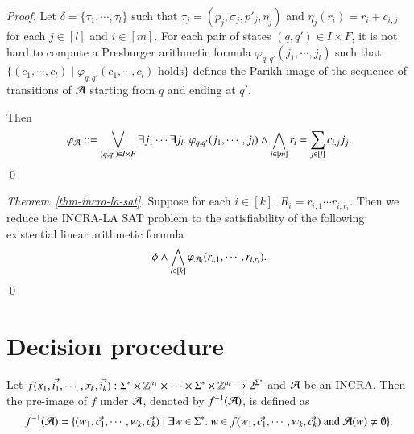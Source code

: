 \documentclass[sigplan,review,anonymous]{acmart}\settopmatter{printfolios=true,printccs=false,printacmref=false}
\begin{document}
\begin{proof}
	Let $\delta = \{\tau_1, \cdots, \tau_l\}$ such that $\tau_j = (p_j, \sigma_j, p'_j, \eta_j)$ and $\eta_j(r_i) = r_i + c_{i,j}$ for each $j \in [l]$ and $i \in [m]$.
	For each pair of states $(q, q') \in I \times F$, it is not hard to compute a Presburger arithmetic formula $\varphi_{q,q'}(j_1, \cdots, j_l)$ such that $\{(c_1, \cdots, c_l) \mid \varphi_{q,q'}(c_1, \cdots, c_l) \mbox{ holds}\}$ defines the Parikh image of the sequence of transitions of $\mathcal{A}$ starting from $q$ and ending at $q'$. 
	
	Then 
	\[\varphi_\Aut ::= \bigvee \limits_{(q,q') \in I \times F} \exists j_1 \cdots \exists j_l.\ \varphi_{q,q'}(j_1, \cdots, j_l) \wedge \bigwedge \limits_{i \in [m]} r_i = \sum \limits_{j \in [l]} c_{i,j} j_j.\]
	\qed
\end{proof}

\begin{proof}[Theorem~\ref{thm-incra-la-sat}]
	Suppose for each $i \in [k]$, $R_i = r_{i, 1} \cdots r_{i, r_i}$. Then we reduce the INCRA-LA SAT problem to the satisfiability of the following existential linear arithmetic formula
	\[
	\phi \wedge \bigwedge \limits_{i \in [k]} \varphi_{\mathcal{A}_i}(r_{i,1}, \cdots, r_{i, r_i}).
	\]
	\qed
\end{proof}


\section{Decision procedure}

\begin{definition}
	Let $f(x_1, \vec{i_1}, \cdots, x_k, \vec{i_k}): \Sigma^* \times \mathbb{Z}^{n_1} \times \cdots \times \Sigma^* \times \mathbb{Z}^{n_k} \rightarrow 2^{\Sigma^*}$ and $\mathcal{A}$ be an INCRA. Then the pre-image of $f$ under $\mathcal{A}$, denoted by $f^{-1}(\mathcal{A})$, is defined as 
	\[f^{-1}(\mathcal{A}) = \{(w_1, \vec{c_1}, \cdots, w_k, \vec{c_k}) \mid \exists w \in \Sigma^*.\ w \in f(w_1, \vec{c_1}, \cdots, w_k, \vec{c_k}) \mbox{ and } \mathcal{A}(w) \neq \emptyset\}.\]
\end{definition}
\end{document}
